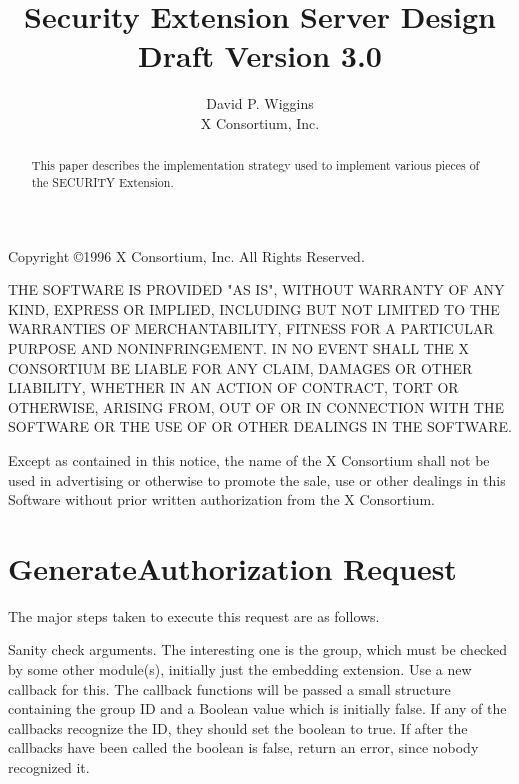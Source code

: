 \setlength{\parindent}{0 pt}
\setlength{\parskip}{6pt}




\title{Security Extension Server Design\\Draft Version 3.0}
\author{David P. Wiggins\\X Consortium, Inc.}
\maketitle

\begin{abstract}
This paper describes the implementation strategy used to implement
various pieces of the SECURITY Extension.
\end{abstract}
\thispagestyle{empty}

\eject

Copyright \copyright 1996 X Consortium, Inc.  All Rights Reserved.

THE SOFTWARE IS PROVIDED "AS IS", WITHOUT WARRANTY OF ANY KIND,
EXPRESS OR IMPLIED, INCLUDING BUT NOT LIMITED TO THE WARRANTIES OF
MERCHANTABILITY, FITNESS FOR A PARTICULAR PURPOSE AND NONINFRINGEMENT.
IN NO EVENT SHALL THE X CONSORTIUM BE LIABLE FOR ANY CLAIM, DAMAGES OR
OTHER LIABILITY, WHETHER IN AN ACTION OF CONTRACT, TORT OR OTHERWISE,
ARISING FROM, OUT OF OR IN CONNECTION WITH THE SOFTWARE OR THE USE OF
OR OTHER DEALINGS IN THE SOFTWARE.

Except as contained in this notice, the name of the X Consortium shall
not be used in advertising or otherwise to promote the sale, use or
other dealings in this Software without prior written authorization
from the X Consortium.

\eject

\section{GenerateAuthorization Request}

The major steps taken to execute this request are as follows.

Sanity check arguments.  The interesting one is the group, which must
be checked by some other module(s), initially just the embedding
extension.  Use a new callback for this.  The callback functions will
be passed a small structure containing the group ID and a Boolean
value which is initially false.  If any of the callbacks recognize the
ID, they should set the boolean to true.  If after the callbacks have
been called the boolean is false, return an error, since nobody
recognized it.

